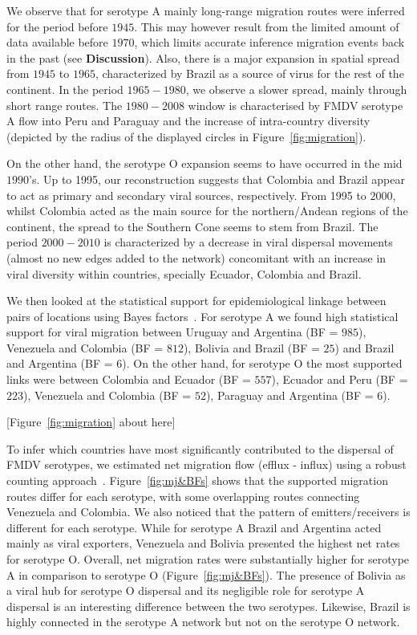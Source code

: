 \documentclass[10pt]{article}
\begin{document}
We observe that for serotype A mainly long-range migration routes were inferred for the period before $1945$.
This may however result from the limited amount of data available before $1970$, which limits accurate inference migration events back in the past (see \textbf{Discussion}).
Also, there is a major expansion in spatial spread from $1945$ to $1965$, characterized by Brazil as a source of virus for the rest of the continent.
In the period $1965-1980$, we observe a slower spread, mainly through short range routes.
The $1980-2008$ window is characterised by FMDV serotype A flow into Peru and Paraguay and the increase of intra-country diversity (depicted by the radius of the displayed circles in Figure~\ref{fig:migration}).   

On the other hand, the serotype O expansion seems to have occurred in the mid $1990$'s.
Up to 1995, our reconstruction suggests that Colombia and Brazil appear to act as primary and secondary viral sources, respectively.
From 1995 to $2000$, whilst Colombia acted as the main source for the northern/Andean regions of the continent, the spread to the Southern Cone seems to stem from Brazil.
The period $2000-2010$ is characterized by a decrease in viral dispersal movements (almost no new edges added to the network) concomitant with an increase in viral diversity within countries, specially Ecuador, Colombia and Brazil.

We then looked at the statistical support for epidemiological linkage between pairs of locations using Bayes factors~\cite{roots}.
For serotype A we found high statistical support for viral migration between Uruguay and Argentina (BF = $985$), Venezuela and Colombia (BF = $812$), Bolivia and Brazil (BF = $25$) and Brazil and Argentina (BF = $6$).
On the other hand, for serotype O the most supported links were between Colombia and Ecuador (BF = $557$), Ecuador and Peru (BF = $223$),  Venezuela and Colombia (BF = $52$), Paraguay and Argentina (BF = $6$). 

\begin{center}
 [Figure~\ref{fig:migration} about here]
\end{center}

To infer which countries have most significantly contributed to the dispersal of FMDV serotypes, we estimated net migration flow (efflux - influx) using a robust counting approach~\cite{Minin2008}.
Figure~\ref{fig:mj&BFs} shows that the supported migration routes differ for each serotype, with some overlapping routes connecting Venezuela and Colombia. 
We also noticed that the pattern of emitters/receivers is different for each serotype.
While for serotype A Brazil and Argentina acted mainly as viral exporters, Venezuela and Bolivia presented the highest net rates for serotype O.
Overall, net migration rates were substantially higher for serotype A in comparison to serotype O (Figure~\ref{fig:mj&BFs}).
The presence of Bolivia as a viral hub for serotype O dispersal and its negligible role for serotype A  dispersal is an interesting difference between the two serotypes. 
Likewise, Brazil is highly connected in the serotype A network but not on the serotype O network.
\end{document}

